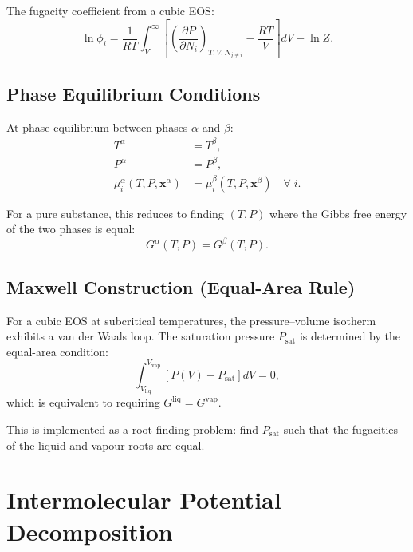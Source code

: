 \documentclass[11pt]{article}
\begin{document}
The fugacity coefficient from a cubic EOS:
\begin{equation}
  \ln \phi_i = \frac{1}{RT}\int_V^\infty
    \left[\left(\frac{\partial P}{\partial N_i}\right)_{T,V,N_{j\neq i}}
    - \frac{RT}{V}\right] dV - \ln Z.
  \label{eq:fugacity}
\end{equation}

\subsection{Phase Equilibrium Conditions}

At phase equilibrium between phases $\alpha$ and $\beta$:
\begin{align}
  T^\alpha &= T^\beta, \label{eq:thermal_eq} \\
  P^\alpha &= P^\beta, \label{eq:mechanical_eq} \\
  \mu_i^\alpha(T,P,\mathbf{x}^\alpha) &=
    \mu_i^\beta(T,P,\mathbf{x}^\beta)
    \quad \forall\;i.
  \label{eq:chemical_eq}
\end{align}

For a pure substance, this reduces to finding $(T,P)$ where the
Gibbs free energy of the two phases is equal:
\begin{equation}
  G^\alpha(T,P) = G^\beta(T,P).
  \label{eq:gibbs_equality}
\end{equation}

\subsection{Maxwell Construction (Equal-Area Rule)}

For a cubic EOS at subcritical temperatures, the pressure--volume
isotherm exhibits a van der Waals loop.  The saturation pressure
$P_\mathrm{sat}$ is determined by the equal-area condition:
\begin{equation}
  \int_{V_\mathrm{liq}}^{V_\mathrm{vap}}
    \left[P(V) - P_\mathrm{sat}\right] dV = 0,
  \label{eq:maxwell_construction}
\end{equation}
which is equivalent to requiring $G^\mathrm{liq} = G^\mathrm{vap}$.

This is implemented as a root-finding problem: find $P_\mathrm{sat}$
such that the fugacities of the liquid and vapour roots are equal.


\section{Intermolecular Potential Decomposition}
\end{document}
